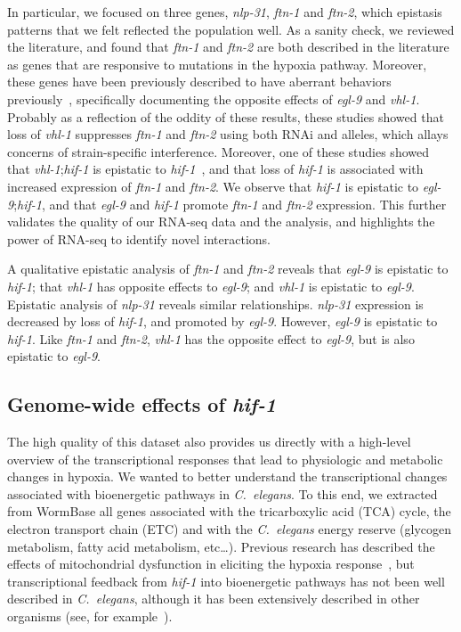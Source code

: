 \documentclass[9pt,twocolumn,twoside]{pnas-new}
\newcommand{\cel}{\emph{C.~elegans}}
\newcommand{\nlp}{\emph{nlp-31}}
\newcommand{\ftna}{\emph{ftn-1}}
\newcommand{\ftnb}{\emph{ftn-2}}
\newcommand{\egl}{\emph{egl-9}}
\newcommand{\vhl}{\emph{vhl-1}}
\newcommand{\hif}{\emph{hif-1}}
\begin{document}
In particular, we focused on three genes, \nlp{}, \ftna{} and \ftnb{}, which
epistasis patterns that we felt reflected the population well. As a sanity check,
we reviewed the literature, and found that \ftna{} and \ftnb{} are both described
in the literature as genes that are responsive to mutations in the hypoxia pathway.
Moreover, these genes have been previously described to have aberrant behaviors
previously~\cite{Ackerman2012,Romney2011}, specifically documenting the opposite
effects of \egl{} and \vhl{}. Probably as a reflection of the oddity of these
results, these studies showed that loss of \vhl{} suppresses \ftna{} and \ftnb{}
using both RNAi and alleles, which allays concerns of strain-specific interference.
Moreover, one of these studies showed that \vhl{};\hif{}
is epistatic to \hif{}~\cite{Ackerman2012}, and that loss of \hif{} is associated
with increased expression of \ftna{} and \ftnb{}. We observe that \hif{} is
epistatic to \egl{};\hif{}, and that \egl{} and \hif{} promote \ftna{} and
\ftnb{}
expression.
This further validates the quality of our RNA-seq data and the analysis, and
highlights the power of RNA-seq to identify novel interactions.

A qualitative epistatic analysis of \ftna{} and \ftnb{} reveals that \egl{} is
epistatic to \hif{}; that \vhl{} has opposite effects to \egl{}; and \vhl{} is
epistatic to \egl{}. Epistatic analysis of \nlp{} reveals similar relationships.
\nlp{} expression is decreased by loss of \hif{}, and promoted by \egl{}. However,
\egl{} is epistatic to \hif{}. Like \ftna{} and \ftnb{}, \vhl{} has the opposite
effect to \egl{}, but is also epistatic to \egl{}.

\subsection{Genome-wide effects of \hif{}}
\label{sub:metabolism}

The high quality of this dataset also provides us directly with a high-level
overview of the transcriptional responses that lead to physiologic and metabolic
changes in hypoxia. We wanted to better understand the transcriptional changes
associated with bioenergetic pathways in \cel{}. To this end, we extracted from
WormBase all genes associated with the tricarboxylic acid (TCA) cycle, the
electron transport chain (ETC) and with the \cel{} energy reserve (glycogen
metabolism, fatty acid metabolism, etc\ldots). Previous research has described
the effects of mitochondrial dysfunction in eliciting the hypoxia
response~\cite{Lee2010}, but transcriptional feedback from \hif{} into
bioenergetic pathways has not been well described in \cel{}, although it has been
extensively described in other organisms (see, for example~\cite{Semenza1994,
Semenza2012}).
\end{document}
